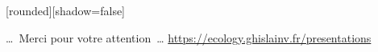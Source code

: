 
{
  [rounded][shadow=false]
  \begin{frame}[plain]
    \begin{block}{}
      \begin{center}
        \ldots~Merci pour votre attention~\ldots
        \url{https://ecology.ghislainv.fr/presentations}
      \end{center}
    \end{block}
  \end{frame}
}
